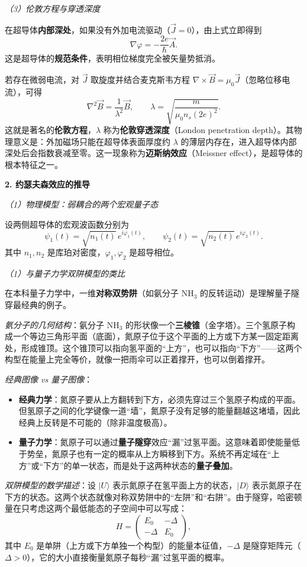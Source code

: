 \textit{（3）伦敦方程与穿透深度}

在超导体\textbf{内部深处}，如果没有外加电流驱动（$\vec{J}=0$），由上式立即得到
\[
\nabla\varphi = -\frac{2e}{\hbar}\vec{A}.
\]
这是超导体的\textbf{规范条件}，表明相位梯度完全被矢量势抵消。

若存在微弱电流，对 $\vec{J}$ 取旋度并结合麦克斯韦方程 $\nabla\times\vec{B} = \mu_0\vec{J}$（忽略位移电流），可得
\[
\nabla^2\vec{B} = \frac{1}{\lambda^2}\vec{B}, \qquad \lambda = \sqrt{\frac{m}{\mu_0 n_s (2e)^2}}.
\]
这就是著名的\textbf{伦敦方程}，$\lambda$ 称为\textbf{伦敦穿透深度}（London penetration depth）。其物理意义是：外加磁场只能在超导体表面厚度约 $\lambda$ 的薄层内存在，进入超导体内部深处后会指数衰减至零。这一现象称为\textbf{迈斯纳效应}（Meissner effect），是超导体的根本特征之一。

\textbf{2. 约瑟夫森效应的推导}

\textit{（1）物理模型：弱耦合的两个宏观量子态}

设两侧超导体的宏观波函数分别为
\[
\psi_1(t) = \sqrt{n_1(t)}\,e^{i\varphi_1(t)}, \qquad
\psi_2(t) = \sqrt{n_2(t)}\,e^{i\varphi_2(t)}.
\]
其中 $n_1, n_2$ 是库珀对密度，$\varphi_1, \varphi_2$ 是超导相位。

\textit{（1）与量子力学双阱模型的类比}

在本科量子力学中，一维\textbf{对称双势阱}（如氨分子 $\text{NH}_3$ 的反转运动）是理解量子隧穿最经典的例子。

\textit{氨分子的几何结构}：氨分子 $\text{NH}_3$ 的形状像一个\textbf{三棱锥}（金字塔）。三个氢原子构成一个等边三角形平面（底面），氮原子位于这个平面的上方或下方某一固定距离处，形成锥顶。这个锥顶可以指向氢平面的``上方''，也可以指向``下方''——这两个构型在能量上完全等价，就像一把雨伞可以正着撑开，也可以倒着撑开。

\textit{经典图像 vs 量子图像}：
\begin{itemize}[nosep]
    \item \textbf{经典力学}：氮原子要从上方翻转到下方，必须先穿过三个氢原子构成的平面。但氢原子之间的化学键像一道``墙''，氮原子没有足够的能量翻越这堵墙，因此经典上反转是不可能的（除非温度极高）。
    \item \textbf{量子力学}：氮原子可以通过\textbf{量子隧穿}效应``漏''过氢平面。这意味着即使能量低于势垒，氮原子也有一定的概率从上方瞬移到下方。系统不再定域在``上方''或``下方''的单一状态，而是处于这两种状态的\textbf{量子叠加}。
\end{itemize}

\textit{双阱模型的数学描述}：设 $|U\rangle$ 表示氮原子在氢平面上方的状态，$|D\rangle$ 表示氮原子在下方的状态。这两个状态就像对称双势阱中的``左阱''和``右阱''。由于隧穿，哈密顿量在只考虑这两个最低能态的子空间中可以写成：
\[
H = \begin{pmatrix} E_0 & -\Delta \\ -\Delta & E_0 \end{pmatrix},
\]
其中 $E_0$ 是单阱（上方或下方单独一个构型）的能量本征值，$-\Delta$ 是隧穿矩阵元（$\Delta>0$），它的大小直接衡量氮原子每秒``漏''过氢平面的概率。

